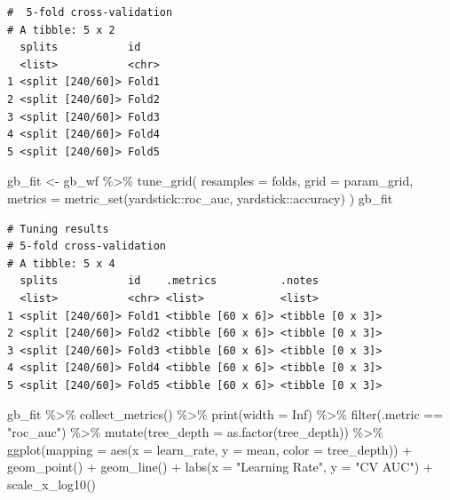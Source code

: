 \documentclass[
]{article}
\newenvironment{Shaded}{\begin{snugshade}}{\end{snugshade}}
\newcommand{\AttributeTok}[1]{\textcolor[rgb]{0.40,0.45,0.13}{#1}}
\newcommand{\ConstantTok}[1]{\textcolor[rgb]{0.56,0.35,0.01}{#1}}
\newcommand{\FunctionTok}[1]{\textcolor[rgb]{0.28,0.35,0.67}{#1}}
\newcommand{\NormalTok}[1]{\textcolor[rgb]{0.00,0.23,0.31}{#1}}
\newcommand{\OtherTok}[1]{\textcolor[rgb]{0.00,0.23,0.31}{#1}}
\newcommand{\SpecialCharTok}[1]{\textcolor[rgb]{0.37,0.37,0.37}{#1}}
\newcommand{\StringTok}[1]{\textcolor[rgb]{0.13,0.47,0.30}{#1}}
\begin{document}
\begin{verbatim}
#  5-fold cross-validation 
# A tibble: 5 x 2
  splits           id   
  <list>           <chr>
1 <split [240/60]> Fold1
2 <split [240/60]> Fold2
3 <split [240/60]> Fold3
4 <split [240/60]> Fold4
5 <split [240/60]> Fold5
\end{verbatim}

\begin{Shaded}
\begin{Highlighting}[]
\NormalTok{gb\_fit }\OtherTok{\textless{}{-}}\NormalTok{ gb\_wf }\SpecialCharTok{\%\textgreater{}\%}
  \FunctionTok{tune\_grid}\NormalTok{(}
    \AttributeTok{resamples =}\NormalTok{ folds,}
    \AttributeTok{grid =}\NormalTok{ param\_grid,}
    \AttributeTok{metrics =} \FunctionTok{metric\_set}\NormalTok{(yardstick}\SpecialCharTok{::}\NormalTok{roc\_auc,}
\NormalTok{                         yardstick}\SpecialCharTok{::}\NormalTok{accuracy)}
\NormalTok{    )}
\NormalTok{gb\_fit}
\end{Highlighting}
\end{Shaded}

\begin{verbatim}
# Tuning results
# 5-fold cross-validation 
# A tibble: 5 x 4
  splits           id    .metrics          .notes          
  <list>           <chr> <list>            <list>          
1 <split [240/60]> Fold1 <tibble [60 x 6]> <tibble [0 x 3]>
2 <split [240/60]> Fold2 <tibble [60 x 6]> <tibble [0 x 3]>
3 <split [240/60]> Fold3 <tibble [60 x 6]> <tibble [0 x 3]>
4 <split [240/60]> Fold4 <tibble [60 x 6]> <tibble [0 x 3]>
5 <split [240/60]> Fold5 <tibble [60 x 6]> <tibble [0 x 3]>
\end{verbatim}

\begin{Shaded}
\begin{Highlighting}[]
\NormalTok{gb\_fit }\SpecialCharTok{\%\textgreater{}\%}
  \FunctionTok{collect\_metrics}\NormalTok{() }\SpecialCharTok{\%\textgreater{}\%}
  \FunctionTok{print}\NormalTok{(}\AttributeTok{width =} \ConstantTok{Inf}\NormalTok{) }\SpecialCharTok{\%\textgreater{}\%}
  \FunctionTok{filter}\NormalTok{(.metric }\SpecialCharTok{==} \StringTok{"roc\_auc"}\NormalTok{) }\SpecialCharTok{\%\textgreater{}\%}
  \FunctionTok{mutate}\NormalTok{(}\AttributeTok{tree\_depth =} \FunctionTok{as.factor}\NormalTok{(tree\_depth)) }\SpecialCharTok{\%\textgreater{}\%}
  \FunctionTok{ggplot}\NormalTok{(}\AttributeTok{mapping =} \FunctionTok{aes}\NormalTok{(}\AttributeTok{x =}\NormalTok{ learn\_rate, }\AttributeTok{y =}\NormalTok{ mean, }\AttributeTok{color =}\NormalTok{ tree\_depth)) }\SpecialCharTok{+}
  \FunctionTok{geom\_point}\NormalTok{() }\SpecialCharTok{+}
  \FunctionTok{geom\_line}\NormalTok{() }\SpecialCharTok{+}
  \FunctionTok{labs}\NormalTok{(}\AttributeTok{x =} \StringTok{"Learning Rate"}\NormalTok{, }\AttributeTok{y =} \StringTok{"CV AUC"}\NormalTok{) }\SpecialCharTok{+}
  \FunctionTok{scale\_x\_log10}\NormalTok{()}
\end{Highlighting}
\end{Shaded}
\end{document}
